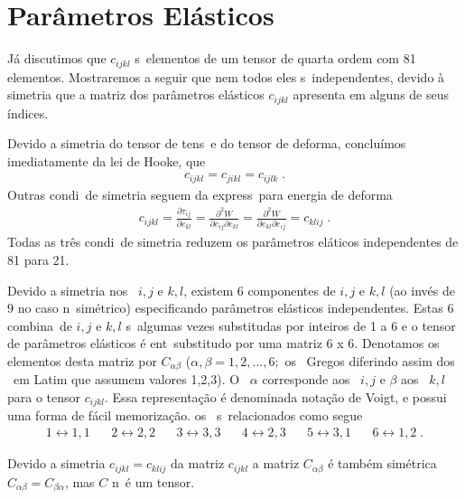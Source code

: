 \section{Par\^ametros El\'asticos}

J\'a discutimos que $c_{ijkl}$ s\ao\ elementos de um
tensor de quarta ordem com 81 elementos. Mostraremos a seguir 
que nem todos eles s\ao\ independentes, devido \`a
simetria que a matriz dos par\^ametros el\'asticos $c_{ijkl}$ 
apresenta em alguns de seus \'indices.

Devido a simetria do tensor de tens\ao\ e do tensor de
deforma\cao, conclu\'imos imediatamente da lei de Hooke, que
\begin{eqnarray}
c_{ijkl} = c_{jikl} = c_{ijlk} \; .
\end{eqnarray}
Outras condi\coes\ de simetria seguem da express\ao\ para
energia de deforma\cao
\begin{eqnarray}
c_{ijkl} = \frac{\partial \tau_{ij}}{\partial e_{kl}}
= \frac{\partial^2 W}{\partial e_{ij} \partial e_{kl}}
= \frac{\partial^2 W}{\partial e_{kl} \partial e_{ij}}
= c_{klij} \; .
\end{eqnarray}
Todas as tr\^es condi\coes\ de simetria reduzem os
par\^ametros el\'aticos independentes de 81 para 21.

Devido a simetria nos \indices\ $i,j$ e $k,l$, existem
6 componentes de $i,j$ e $k,l$ (ao inv\'es  de 9 no caso
n\ao\ sim\'etrico) especificando par\^ametros el\'asticos
independentes. Estas 6 combina\coes\ de $i,j$ e $k,l$
s\ao\ algumas vezes substitu\ih das por inteiros de 1 a 6
e o tensor de par\^ametros el\'asticos \'e ent\ao\
substitu\ih do por uma matriz 6 x 6. Denotamos os
elementos desta matriz por $C_{\alpha \beta}$ ($\alpha,
\beta = 1,2,...,6;$ os \indices\ Gregos diferindo assim
dos \indices\ em Latim que assumem valores 1,2,3). O
\indice\ $\alpha$ corresponde aos \indices\ $i,j$ e 
$\beta$ aos \indices\ $k,l$ para o tensor $c_{ijkl}$. Essa
representa\c{c}\~ao \'e denominada nota\c{c}\~ao de Voigt, e possui
uma forma de f\'acil memoriza\c{c}\~ao.
os \indices\ s\ao\ relacionados como segue
\begin{eqnarray*}
1 \leftrightarrow 1,1 \;\;\;\;\;\;
2 \leftrightarrow 2,2 \;\;\;\;\;\;
3 \leftrightarrow 3,3 \;\;\;\;\;\;
4 \leftrightarrow 2,3 \;\;\;\;\;\;
5 \leftrightarrow 3,1 \;\;\;\;\;\;
6 \leftrightarrow 1,2 \;.
\end{eqnarray*} 

Devido a simetria $c_{ijkl} = c_{klij}$ da matriz
$c_{ijkl}$ a matriz $C_{\alpha \beta}$ \'e tamb\'em
sim\'etrica $C_{\alpha \beta} = C_{\beta \alpha}$, mas $C$
n\ao\ \'e um tensor.

